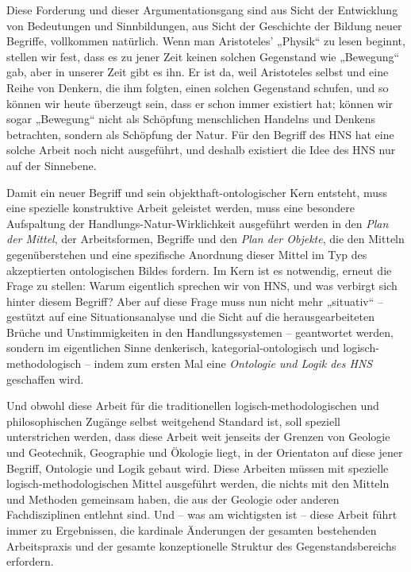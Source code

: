 \documentclass[11pt,a4paper]{article}
\begin{document}
Diese Forderung und dieser Argumentationsgang sind aus Sicht der Entwicklung
von Bedeutungen und Sinnbildungen, aus Sicht der Geschichte der Bildung neuer
Begriffe, vollkommen natürlich. Wenn man Aristoteles' „Physik“ zu lesen
beginnt, stellen wir fest, dass es zu jener Zeit keinen solchen Gegenstand wie
„Bewegung“ gab, aber in unserer Zeit gibt es ihn.  Er ist da, weil Aristoteles
selbst und eine Reihe von Denkern, die ihm folgten, einen solchen Gegenstand
schufen, und so können wir heute überzeugt sein, dass er schon immer existiert
hat; können wir sogar „Bewegung“ nicht als Schöpfung menschlichen Handelns und
Denkens betrachten, sondern als Schöpfung der Natur. Für den Begriff des HNS
hat eine solche Arbeit noch nicht ausgeführt, und deshalb existiert die
Idee des HNS nur auf der Sinnebene.

Damit ein neuer Begriff und sein objekthaft-ontologischer Kern entsteht, muss
eine spezielle konstruktive Arbeit geleistet werden, muss eine besondere
Aufspaltung der Handlungs-Natur-Wirklichkeit ausgeführt werden in den
\emph{Plan der Mittel}, der Arbeitsformen, Begriffe und den \emph{Plan der
  Objekte}, die den Mitteln gegenüberstehen und eine spezifische Anordnung
dieser Mittel im Typ des akzeptierten ontologischen Bildes fordern.  Im Kern
ist es notwendig, erneut die Frage zu stellen: Warum eigentlich sprechen wir
von HNS, und was verbirgt sich hinter diesem Begriff?  Aber auf diese Frage
muss nun nicht mehr „situativ“ -- gestützt auf eine Situationsanalyse und die
Sicht auf die herausgearbeiteten Brüche und Unstimmigkeiten in den
Handlungssystemen -- geantwortet werden, sondern im eigentlichen Sinne
denkerisch, kategorial-ontologisch und logisch-methodologisch -- indem zum
ersten Mal eine \emph{Ontologie und Logik des HNS} geschaffen wird.

Und obwohl diese Arbeit für die traditionellen logisch-methodologischen und
philosophischen Zugänge selbst weitgehend Standard ist, soll speziell
unterstrichen werden, dass diese Arbeit weit jenseits der Grenzen von Geologie
und Geotechnik, Geographie und Ökologie liegt, in der Orientaton auf diese
jener Begriff, Ontologie und Logik gebaut wird. Diese Arbeiten müssen mit
spezielle logisch-methodologischen Mittel ausgeführt werden, die nichts mit
den Mitteln und Methoden gemeinsam haben, die aus der Geologie oder anderen
Fachdisziplinen entlehnt sind. Und -- was am wichtigsten ist -- diese Arbeit
führt immer zu Ergebnissen, die kardinale Änderungen der gesamten bestehenden
Arbeitspraxis und der gesamte konzeptionelle Struktur des Gegenstandsbereichs
erfordern.
\end{document}

